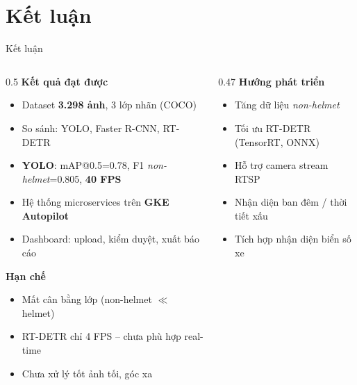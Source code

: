 \section{Kết luận}

\begin{frame}{Kết luận}

\begin{columns}[T]
\begin{column}{0.5\textwidth}
  \textbf{Kết quả đạt được}\footnotesize
  \begin{itemize}
    \item Dataset \textbf{3.298 ảnh}, 3 lớp nhãn (COCO)
    \item So sánh: YOLO, Faster R-CNN, RT-DETR
    \item \textbf{YOLO}: mAP@0.5=0.78, F1 \textit{non-helmet}=0.805, \textbf{40 FPS}
    \item Hệ thống microservices trên \textbf{GKE Autopilot}
    \item Dashboard: upload, kiểm duyệt, xuất báo cáo
  \end{itemize}
  \vspace{0.15em}
  \textbf{Hạn chế}\footnotesize
  \begin{itemize}
    \item Mất cân bằng lớp (non-helmet $\ll$ helmet)
    \item RT-DETR chỉ 4 FPS -- chưa phù hợp real-time
    \item Chưa xử lý tốt ảnh tối, góc xa
  \end{itemize}
\end{column}
\begin{column}{0.47\textwidth}
  \textbf{Hướng phát triển}\footnotesize
  \begin{itemize}
    \item Tăng dữ liệu \textit{non-helmet}
    \item Tối ưu RT-DETR (TensorRT, ONNX)
    \item Hỗ trợ camera stream RTSP
    \item Nhận diện ban đêm / thời tiết xấu
    \item Tích hợp nhận diện biển số xe
  \end{itemize}
\end{column}
\end{columns}

\end{frame}
